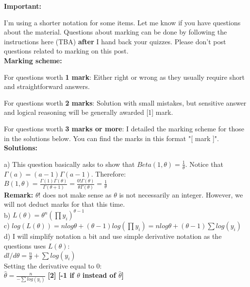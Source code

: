 \documentclass[20pt]{report}
\newcommand{\g}{\Gamma}
\begin{document}
\textbf{Important:}

I'm using a shorter notation for some items. Let me know if you have questions about the material. Questions about marking can be done by following the instructions here (TBA) \textbf{after} I hand back your quizzes. Please don't post questions related to marking on this post. \\

\textbf{Marking scheme:}

For questions worth \textbf{1 mark}: Either right or wrong as they usually require short and straightforward answers.

For questions worth \textbf{2 marks}: Solution with small mistakes, but sensitive answer and logical reasoning will be generally awarded [1] mark.

For questions worth \textbf{3 marks or more}: I detailed the marking scheme for those in the solutions below. You can find the marks in this format "[ mark ]".\\



\textbf{Solutions:}

a) This question basically asks to show that $Beta(1,\theta) = \frac{1}{\theta} $. Notice that
$ \Gamma(a) = (a-1)\Gamma(a-1) $. Therefore: \\

$ B(1, \theta) = \frac{\Gamma(1)\Gamma(\theta)}{\g(\theta + 1)} = \frac{0!\g(\theta)}{\theta\g(\theta)} = \frac{1}{\theta}
$ \\

\textbf{Remark: }$\theta!$ does not make sense as $\theta$ is not necessarily an integer. However, we will not deduct marks for that this time. \\


b)
$ 
L(\theta) = \theta^n (\prod y_i)^{\theta-1} 
$\\

c) 
$
log(L(\theta)) = nlog{\theta} + (\theta-1)log(\prod y_i) = 
nlog{\theta} + (\theta-1)\sum log(y_i)
$ \\

d) I will simplify notation a bit and use simple derivative notation as the questions uses $L(\theta)$: \\
$
dl/d\theta = \frac {n}{\theta} + \sum log(y_i)
$ \\

Setting the derivative equal to 0: \\
$
\hat{\theta} = \frac{n}{- \sum log(y_i)}
$ \textbf{[2]}\textbf{ [-1 if $\theta$ instead of $\hat{\theta}$] }\\
\end{document}
